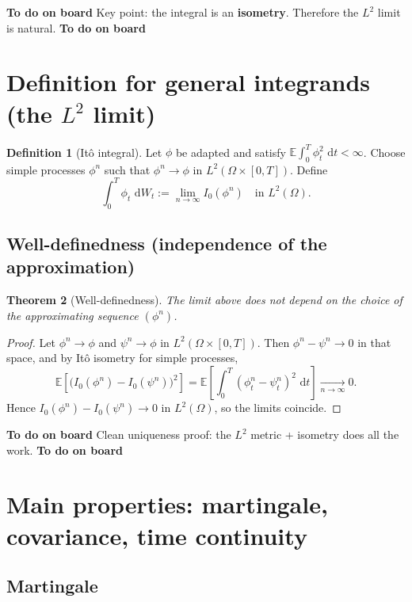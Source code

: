 \documentclass[11pt]{article}
\newcommand{\E}{\mathbb{E}}
\newcommand{\1}{\mathbf{1}}
\newcommand{\dd}{\,\mathrm{d}}
\numberwithin{equation}{section}
\theoremstyle{plain}
\newtheorem{theorem}{Theorem}[section]
\theoremstyle{definition}
\newtheorem{definition}[theorem]{Definition}
\theoremstyle{remark}
\begin{document}
\textbf{To do on board}
Key point: the integral is an \textbf{isometry}. Therefore the $L^2$ limit is natural.
\textbf{To do on board}

\section{Definition for general integrands (the $L^2$ limit)}

\begin{definition}[It\^o integral]
Let $\phi$ be adapted and satisfy $\E\!\int_0^T \phi_t^2\,\dd t<\infty$.
Choose simple processes $\phi^n$ such that $\phi^n\to\phi$ in $L^2(\Omega\times[0,T])$.
Define
\[
\int_0^T \phi_t\,\dd W_t := \lim_{n\to\infty} I_0(\phi^n)
\quad\text{in } L^2(\Omega).
\]
\end{definition}

\subsection{Well-definedness (independence of the approximation)}

\begin{theorem}[Well-definedness]
The limit above does not depend on the choice of the approximating sequence $(\phi^n)$.
\end{theorem}

\begin{proof}
Let $\phi^n\to\phi$ and $\psi^n\to\phi$ in $L^2(\Omega\times[0,T])$. Then $\phi^n-\psi^n\to 0$ in that space, and
by It\^o isometry for simple processes,
\[
\E\!\left[\big(I_0(\phi^n)-I_0(\psi^n)\big)^2\right]
=\E\!\left[\int_0^T (\phi_t^n-\psi_t^n)^2\,\dd t\right]\xrightarrow[n\to\infty]{}0.
\]
Hence $I_0(\phi^n)-I_0(\psi^n)\to 0$ in $L^2(\Omega)$, so the limits coincide.
\end{proof}

\textbf{To do on board}
Clean uniqueness proof: the $L^2$ metric + isometry does all the work.
\textbf{To do on board}

\section{Main properties: martingale, covariance, time continuity}

\subsection{Martingale}
\end{document}
